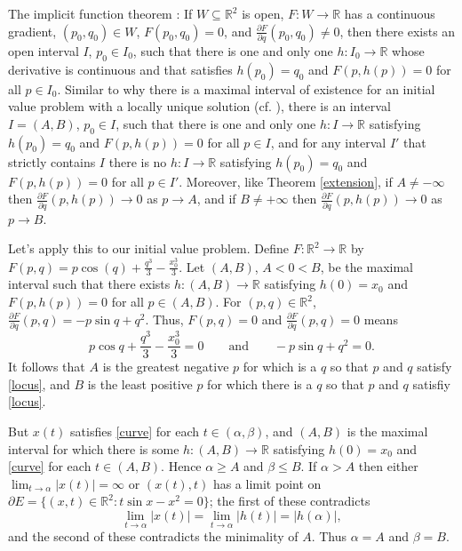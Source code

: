 \documentclass{article}
\begin{document}
The implicit function theorem \cite[p.~36, Theorem 3.2.1]{MR1894435}: If $W \subseteq \mathbb{R}^2$ is open, $F:W \to \mathbb{R}$ has a continuous gradient, $(p_0,q_0) \in W$,
$F(p_0,q_0)=0$, and $\frac{\partial F}{\partial q}(p_0,q_0) \neq 0$, then there exists an open interval $I$, $p_0 \in I_0$, such that there is one and only
one $h:I_0 \to \mathbb{R}$ whose derivative is continuous and that satisfies $h(p_0)=q_0$ and $F(p,h(p))=0$ for all $p \in I_0$.
Similar to why there is a maximal interval of existence for an initial value problem with a locally unique solution (cf. \cite[p.~51, Theorem 2.13]{teschl}), there is an
interval $I=(A,B)$, $p_0 \in I$, such that there is one and only one $h:I \to \mathbb{R}$ satisfying $h(p_0)=q_0$ and $F(p,h(p))=0$ for all $p \in I$, and for any interval
$I'$ that strictly contains $I$ there is no $h:I \to \mathbb{R}$ satisfying $h(p_0)=q_0$ and $F(p,h(p))=0$ for all $p \in I'$. Moreover, like Theorem
\ref{extension}, if $A \neq -\infty$ then
$\frac{\partial F}{\partial q}(p,h(p)) \to 0$ as $p \to A$, and if $B \neq +\infty$ then $\frac{\partial F}{\partial q}(p,h(p)) \to 0$ as $p \to B$.

Let's apply this to our initial value problem. Define $F:\mathbb{R}^2 \to \mathbb{R}$ by $F(p,q)=p\cos(q)+\frac{q^3}{3}-\frac{x_0^3}{3}$.
Let $(A,B)$, $A<0<B$, be the maximal interval such that there exists $h:(A,B) \to \mathbb{R}$ satisfying $h(0)=x_0$ and $F(p,h(p))=0$ for
all $p \in (A,B)$. 
For $(p,q) \in \mathbb{R}^2$,
$\frac{\partial F}{\partial q}(p,q)=-p\sin q+q^2$. Thus, $F(p,q)=0$ and $\frac{\partial F}{\partial q}(p,q)=0$ means
\begin{equation}
p\cos q+\frac{q^3}{3}-\frac{x_0^3}{3}=0 \qquad \textrm{and}  \qquad -p\sin q+q^2=0.
\label{locus}
\end{equation}
It follows that $A$ is the greatest negative $p$ for which is a $q$ so that $p$ and $q$ satisfy \eqref{locus},
and  $B$ is the least positive $p$ for which there is a $q$ so that $p$ and $q$ satisfiy \eqref{locus}.

But $x(t)$ satisfies \eqref{curve} for each $t \in (\alpha,\beta)$, and $(A,B)$ is the maximal interval for which there is some $h:(A,B) \to \mathbb{R}$ satisfying $h(0)=x_0$ and
\eqref{curve} for each $t \in (A,B)$. Hence $\alpha \geq A$ and $\beta \leq B$.  If $\alpha>A$ then either $\lim_{t \to \alpha}|x(t)|=\infty$ or $(x(t),t)$ has a limit point on 
$\partial E=\{(x,t) \in \mathbb{R}^2: t\sin x-x^2 = 0\}$; the first of these contradicts
\[
\lim_{t \to \alpha}|x(t)|=\lim_{t \to \alpha} |h(t)|=|h(\alpha)|,
\]
and the second of these contradicts the minimality of $A$. Thus $\alpha=A$ and $\beta=B$.
\end{document}
